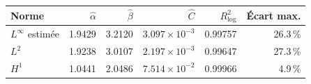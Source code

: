 \begin{tabular}{lrrrrr}
\toprule
Norme & \(\widehat\alpha\) & \(\widehat\beta\) & \(\widehat C\) & \(R^2_{\log}\) & Écart max. \\
\midrule
\(L^\infty\) estimée & 1.9429 & 3.2120 & \(3.097\times10^{-3}\) & 0.99757 & 26.3\,\% \\
\(L^2\) & 1.9238 & 3.0107 & \(2.197\times10^{-3}\) & 0.99647 & 27.3\,\% \\
\(H^1\) & 1.0441 & 2.0486 & \(7.514\times10^{-2}\) & 0.99966 & 4.9\,\% \\
\bottomrule
\end{tabular}
